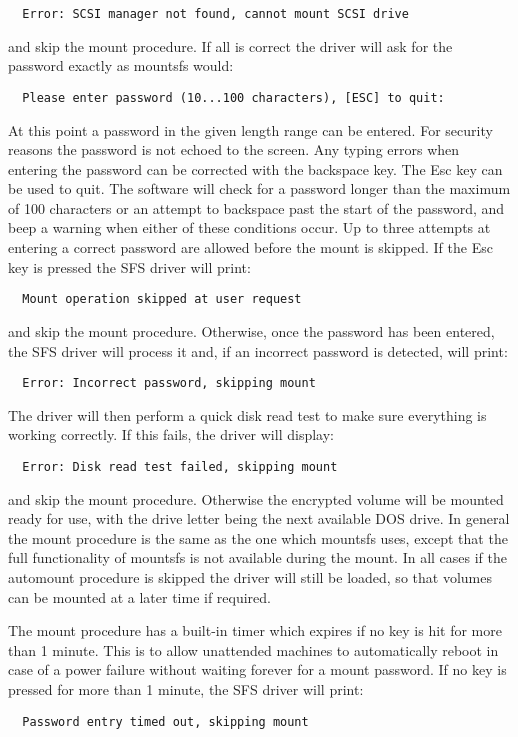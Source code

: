 {\tt \verb|  |Error: SCSI manager not found, cannot mount SCSI drive}

and skip the mount procedure.  If all is correct the driver will ask for the 
password exactly as mountsfs would:

{\tt \verb|  |Please enter password (10...100 characters), [ESC] to quit:}

At this point a password in the given length range can be entered.  For
security reasons the password is not echoed to the screen.  Any typing errors
when entering the password can be corrected with the backspace key.  The Esc
key can be used to quit.  The software will check for a password longer than
the maximum of 100 characters or an attempt to backspace past the start of the
password, and beep a warning when either of these conditions occur.  Up to
three attempts at entering a correct password are allowed before the mount is 
skipped.  If the Esc key is pressed the SFS driver will print:

{\tt \verb|  |Mount operation skipped at user request}

and skip the mount procedure.  Otherwise, once the password has been entered, 
the SFS driver will process it and, if an incorrect password is detected, will 
print:

{\tt \verb|  |Error: Incorrect password, skipping mount}

The driver will then perform a quick disk read test to make sure everything is
working correctly.  If this fails, the driver will display:

{\tt \verb|  |Error: Disk read test failed, skipping mount}

and skip the mount procedure.  Otherwise the encrypted volume will be mounted 
ready for use, with the drive letter being the next available DOS drive.  In 
general the mount procedure is the same as the one which mountsfs uses, except 
that the full functionality of mountsfs is not available during the mount.  In 
all cases if the automount procedure is skipped the driver will still be loaded, so 
that volumes can be mounted at a later time if required.

The mount procedure has a built-in timer which expires if no key is hit for
more than 1 minute.  This is to allow unattended machines to automatically
reboot in case of a power failure without waiting forever for a mount
password.  If no key is pressed for more than 1 minute, the SFS driver will
print:

{\tt \verb|  |Password entry timed out, skipping mount}

